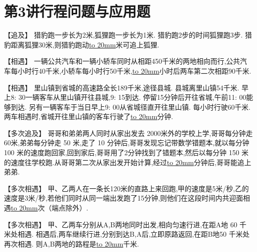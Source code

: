 \section{第3讲\quad 行程问题与应用题}

\item {
    【追及】
    猎豹跑一步长为2米,狐狸跑一步长为1米. 猎豹跑2步的时间狐狸跑3步. 猎豹距离狐狸30米,则猎豹跑动\underline{\hbox to 20mm{}}米可追上狐狸. 
    \vspace{2cm}
}

\item {
    【相遇】
    一辆公共汽车和一辆小轿车同时从相距450千米的两地相向而行,公共汽车每小时行40千米,小轿车每小时行50千米,\underline{\hbox to 20mm{}}小时后两车第二次相距90千米. 
    \vspace{2cm}
}

\item {
    【相遇】
    里山镇到省城的高速路全长189千米,途径县城. 县城离里山镇54千米. 早上8: 30一辆客车从里山镇开往县城,9: 15到达. 停留15分钟后开往省城,午前11: 00能够到达. 另有一辆客车于当日早上9: 00从省城径直开往里山镇. 每小时行驶60千米. 两车相遇时,省城开往里山镇的客车行驶了\underline{\hbox to 20mm{}}分钟.
    \vspace{2cm}
}

\item {
    【多次追及】
    哥哥和弟弟两人同时从家出发去 2000米外的学校上学,哥哥每分钟走 60米,弟弟每分钟走 50 米,走了 10 分钟后,哥哥发现忘记带数学错题本,就以每分钟 100 米的速度跑回家,回到家后,哥哥用了2分钟找到了错题本,然后以每分钟 150 米的速度往学校跑.从哥哥第二次从家出发开始计算,经过\underline{\hbox to 20mm{}}分钟后,哥哥能追上弟弟.
    \vspace{2cm}
}

\item {
    【多次相遇】
    甲、乙两人在一条长120米的直路上来回跑,甲的速度是5米/秒,乙的速度是3米/秒,若他们同时从同一端出发跑了15分钟,则他们在这段时间内共迎面相遇\underline{\hbox to 20mm{}}次（端点除外）. 
    \vspace{2cm}
}

\item {
    【多次相遇】
    甲、乙两车分别从A,B两地同时出发,相向匀速行进,在距A地 60 千米处相遇. 相遇后,两车继续行进,分别到达B,A后,立即原路返回,在距B地50 千米处再次相遇. 则A,B两地的路程是\underline{\hbox to 20mm{}}千米. 
    \vspace{2cm}
}

